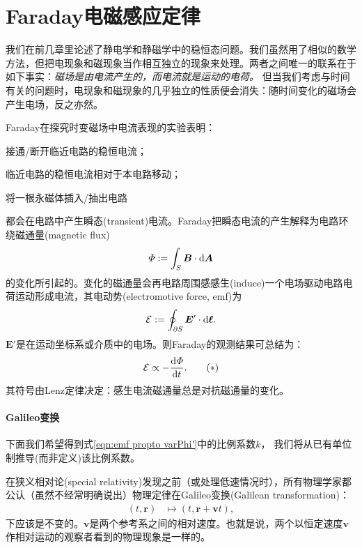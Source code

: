 \section{Faraday电磁感应定律}
\label{sec:Faraday}

我们在前几章里论述了静电学和静磁学中的稳恒态问题。我们虽然用了相似的数学方法，但把电现象和磁现象当作相互独立的现象来处理。两者之间唯一的联系在于如下事实：\textit{磁场是由电流产生的，而电流就是运动的电荷。}
但当我们考虑与时间有关的问题时，电现象和磁现象的几乎独立的性质便会消失：随时间变化的磁场会产生电场，反之亦然。%

Faraday在探究时变磁场中电流表现的实验表明：
\begin{compactenum}
    \item 接通/断开临近电路的稳恒电流；
    \item 临近电路的稳恒电流相对于本电路移动；
    \item 将一根永磁体插入/抽出电路
\end{compactenum}
都会在电路中产生瞬态(transient)电流。Faraday把瞬态电流的产生解释为电路环绕磁通量(magnetic flux)%
\begin{equation}
    \varPhi := \int_S\bm B \cdot \mathop{}\!\mathrm{d}\bm A
\end{equation}
的变化所引起的。变化的磁通量会再电路周围感感生(induce)一个电场驱动电路电荷运动形成电流，其电动势(electromotive force, emf)为
\begin{equation}
    \mathcal E := \oint_{\partial S}\bm E' \cdot \mathop{}\!\mathrm{d}\bm \ell.
\end{equation}
$\bm E'$是在运动坐标系或介质中的电场。则Faraday的观测结果可总结为：
\begin{equation}
    \label{eqn:emf propto varPhi'}
    \mathcal E \propto -\frac{\mathop{}\!\mathrm{d}^{}\varPhi}{\mathrm{d}{t}^{}}.
    \tag{$\ast$}
\end{equation}
其符号由Lenz定律决定：感生电流磁通量总是对抗磁通量的变化。

\paragraph{Galileo变换}

下面我们希望得到式\eqref{eqn:emf propto varPhi'}中的比例系数$k$，%
我们将从已有单位制推导(而非定义)该比例系数。

在狭义相对论(special relativity)发现之前（或处理低速情况时），所有物理学家都公认（虽然不经常明确说出）物理定律在Galileo变换(Galilean transformation)：
\begin{align*}
    (t,\bm r) &\mapsto (t,\bm r + \bm vt),
\end{align*}
下应该是不变的。$\bm v$是两个参考系之间的相对速度。也就是说，两个以恒定速度$\bm v$作相对运动的观察者看到的物理现象是一样的。%

